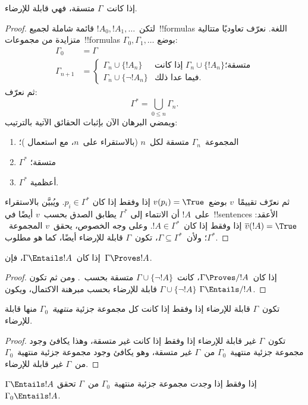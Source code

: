 \documentclass[../../../include/open-logic-section]{subfiles}
\begin{document}
\begin{thm}[الاكتمال]
إذا كانت~$\Gamma$ متسقة، فهي قابلة للإرضاء.
\end{thm}

\begin{proof}
لتكن~$!A_0,!A_1,\dots$ قائمة شاملة لجميع~!!{formula}s اللغة. نعرّف
تعاوديًا متتالية متزايدة من مجموعات~!!{formula}s
$\Gamma_0,\Gamma_1,\dots$ بوضع:
\begin{align*}
\Gamma_0 & = \Gamma\\
\Gamma_{n+1} &  =
\begin{cases}
  \Gamma_n \cup \{!A_n\} & \text{إذا كانت $\Gamma_n\cup\{!A_n\}$
    متسقة؛}\\
  \Gamma_n \cup \{\lnot !A_n\} & \text{فيما عدا ذلك.}
\end{cases}
\end{align*}
ثم نعرّف:
\[
\Gamma^*=\bigcup_{0\le n}\Gamma_n.
\]
ويمضي البرهان الآن بإثبات الحقائق الآتية بالترتيب:
\begin{enumerate}
\item المجموعة~$\Gamma_n$ متسقة لكل~$n$ (بالاستقراء على~$n$، مع استعمال
  )؛
\item $\Gamma^*$ متسقة؛
\item $\Gamma^*$ أعظمية.
\end{enumerate}
ثم نعرّف تقييمًا~$v$ بوضع~$v(p_i)=\True$ إذا وفقط إذا كان
$p_i\in\Gamma^*$. ويُبيَّن بالاستقراء على~$!A$ أن الانتماء إلى
$\Gamma^*$ يطابق الصدق بحسب~$v$ أيضًا في~!!{sentence}s الأعقد:
$\overline{v}(!A)=\True$ إذا وفقط إذا كان~$!A\in\Gamma^*$. وعلى وجه
الخصوص، يحقق~$v$ المجموعة~$\Gamma^*$؛ ولأن~$\Gamma\subseteq\Gamma^*$،
تكون~$\Gamma$ قابلة للإرضاء أيضًا، كما هو مطلوب.
\end{proof}

\begin{cor}
إذا كان~$\Gamma\Entails !A$، فإن~$\Gamma\Proves !A$.
\end{cor}

\begin{proof}
إذا كان~$\Gamma\Proves/ !A$، كانت~$\Gamma\cup\{\lnot !A\}$ متسقة
بحسب~. ومن ثم تكون
$\Gamma\cup\{\lnot !A\}$ قابلة للإرضاء بحسب مبرهنة الاكتمال، ويكون
$\Gamma\Entails/ !A$.
\end{proof}

\begin{prop}
تكون~$\Gamma$ قابلة للإرضاء إذا وفقط إذا كانت كل مجموعة جزئية
\emph{منتهية}~$\Gamma_0$ منها قابلة للإرضاء.
\end{prop}

\begin{proof}
تكون~$\Gamma$ غير قابلة للإرضاء إذا وفقط إذا كانت غير متسقة، وهذا يكافئ
وجود مجموعة جزئية منتهية~$\Gamma_0$ من~$\Gamma$ غير متسقة، وهو يكافئ
وجود مجموعة جزئية منتهية~$\Gamma_0$ من~$\Gamma$ غير قابلة للإرضاء.
\end{proof}

\begin{cor}
$\Gamma\Entails !A$ إذا وفقط إذا وجدت مجموعة جزئية منتهية~$\Gamma_0$
من~$\Gamma$ تحقق~$\Gamma_0\Entails !A$.
\end{cor}
\end{document}
